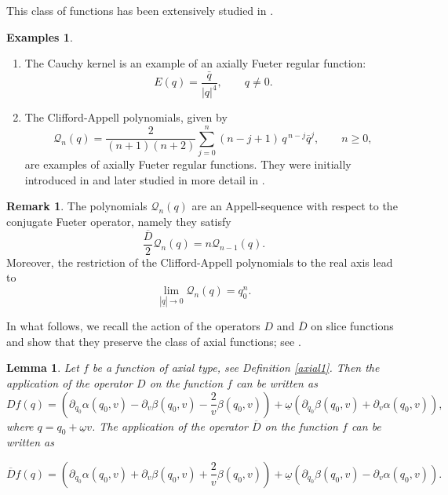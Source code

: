 \documentclass[reqno,11pt]{amsart}
\numberwithin{equation}{section}
\newtheorem{lemma}[theorem]{Lemma}
\theoremstyle{definition}
\newtheorem{remark}[theorem]{{\bf Remark}}
\newtheorem{examples}[theorem]{Examples}
\begin{document}
This class of functions has been extensively studied in \cite{red, green}.




\begin{examples}
\begin{enumerate}
\item The Cauchy kernel is an example of an axially Fueter regular function:
\begin{equation}
\label{kernelC}
E(q) = \frac{\bar{q}}{|q|^4}, \qquad q \neq 0.
\end{equation}
\item The Clifford-Appell polynomials, given by
\begin{equation}
\label{CliffApp}
\mathcal{Q}_n(q) = \frac{2}{(n+1)(n+2)} \sum_{j=0}^n (n-j+1)\, q^{\,n-j} \bar{q}^j,
\qquad n \geq 0,
\end{equation}
are examples of axially Fueter regular functions. They were initially introduced in \cite{CFM, CMF} and later studied in more detail in \cite{ACDDS, DKS}.
\end{enumerate}
\end{examples}

\begin{remark}
The polynomials $ \mathcal{Q}_n(q)$ are an Appell-sequence with respect to the conjugate Fueter operator, namely they satisfy
\begin{equation}
\frac{\overline{D}}{2} \mathcal{Q}_n(q)=n \mathcal{Q}_{n-1}(q).
\end{equation}
Moreover, the restriction of the Clifford-Appell polynomials to the real axis lead to
\begin{equation}
\label{rest}
\lim_{|\underline{q}| \to 0} \mathcal{Q}_n(q)=q_0^n.
\end{equation}

\end{remark}

In what follows, we recall the action of the operators $D$ and $\overline{D}$ on slice functions and show that they preserve the class of axial functions; see \cite{Dixan}.

\begin{lemma}
\label{apDbarD}
Let $f$ be a function of axial type, see Definition \ref{axial1}.
Then the application of the operator $D$ on the function $f$ can be written as
\begin{equation}
\label{axialD}
Df(q)= \left(\partial_{q_0}\alpha(q_0,v)-\partial_v \beta(q_0, v)- \frac{2}{v} \beta(q_0,v) \right)+ \underline{\omega} \left( \partial_{q_0} \beta(q_0,v)+\partial_v \alpha(q_0,v)\right),
\end{equation}
where $q=q_0+\underline{\omega}v$. The application of the operator $\overline{D}$ on the function $f$ can be written as

\begin{equation}
	\label{appbar}
	\overline{D}f(q)= \left(\partial_{q_0}\alpha(q_0,v)+\partial_v \beta(q_0, v)+ \frac{2}{v} \beta(q_0,v) \right)+ \underline{\omega} \left( \partial_{q_0} \beta(q_0,v)-\partial_v \alpha(q_0,v)\right).
\end{equation}

\end{lemma}
\end{document}
